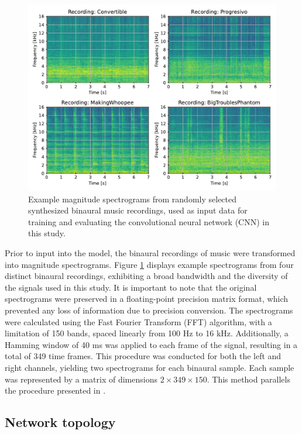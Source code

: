 \documentclass{article}
\begin{document}
\begin{figure}[ht]
  \centering
  \includegraphics[width=\linewidth]{../figures/samples.pdf}
  \caption{\label{fig:samples}Example magnitude spectrograms from randomly selected synthesized binaural music recordings, used as input data for training and evaluating the convolutional neural network (CNN) in this study. }
\end{figure}

Prior to input into the model, the binaural recordings of music were transformed into magnitude spectrograms. Figure \ref{fig:samples} displays example spectrograms from four distinct binaural recordings, exhibiting a broad bandwidth and the diversity of the signals used in this study. It is important to note that the original spectrograms were preserved in a floating-point precision matrix format, which prevented any loss of information due to precision conversion. The spectrograms were calculated using the Fast Fourier Transform (FFT) algorithm, with a limitation of 150 bands, spaced linearly from 100 Hz to 16 kHz. Additionally, a Hamming window of 40 ms was applied to each frame of the signal, resulting in a total of 349 time frames. This procedure was conducted for both the left and right channels, yielding two spectrograms for each binaural sample. Each sample was represented by a matrix of dimensions $2 \times 349 \times 150$. This method parallels the procedure presented in \cite{zielinski_automatic_2022}.

\subsection{Network topology}
\label{subsec:topology}
\end{document}
